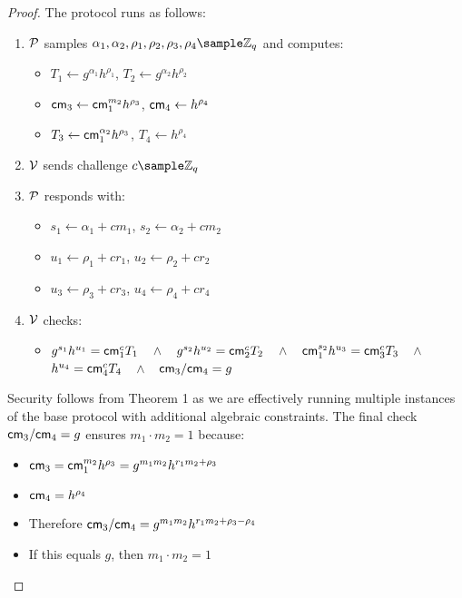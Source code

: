 \begin{proof}
    The protocol runs as follows:
    \begin{enumerate}
        \item $\mathcal{P}$ samples $\alpha_1, \alpha_2, \rho_1, \rho_2, \rho_3, \rho_4 \sample \Z_q$ and computes:
            \begin{itemize}
                \item $T_1 \gets g^{\alpha_1}h^{\rho_1}$, $T_2 \gets g^{\alpha_2}h^{\rho_2}$
                \item $\mathsf{cm}_3 \gets \mathsf{cm}_1^{m_2}h^{\rho_3}$, $\mathsf{cm}_4 \gets h^{\rho_4}$
                \item $T_3 \gets \mathsf{cm}_1^{\alpha_2}h^{\rho_3}$, $T_4 \gets h^{\rho_4}$
            \end{itemize}
        
        \item $\mathcal{V}$ sends challenge $c \sample \Z_q$
        
        \item $\mathcal{P}$ responds with:
            \begin{itemize}
                \item $s_1 \gets \alpha_1 + cm_1$, $s_2 \gets \alpha_2 + cm_2$
                \item $u_1 \gets \rho_1 + cr_1$, $u_2 \gets \rho_2 + cr_2$
                \item $u_3 \gets \rho_3 + cr_3$, $u_4 \gets \rho_4 + cr_4$
            \end{itemize}
            
        \item $\mathcal{V}$ checks:
         \begin{itemize}
            \item $g^{s_1}h^{u_1} = \mathsf{cm}_1^cT_1$ $\;\; \wedge \;\;$ $g^{s_2}h^{u_2} = \mathsf{cm}_2^cT_2$ $\; \; \wedge \;\;$ $\mathsf{cm}_1^{s_2}h^{u_3} = \mathsf{cm}_3^cT_3$ $\;\; \wedge \;\;$ $h^{u_4} = \mathsf{cm}_4^cT_4$ $\;\; \wedge \;\;$ $\mathsf{cm}_3 / \mathsf{cm}_4 = g$
         \end{itemize}
    \end{enumerate}

    \noindent Security follows from Theorem 1 as we are effectively running multiple instances of the base protocol with additional algebraic constraints. The final check $\mathsf{cm}_3/\mathsf{cm}_4 = g$ ensures $m_1 \cdot m_2 = 1$ because:
    \begin{itemize}
        \item $\mathsf{cm}_3 = \mathsf{cm}_1^{m_2}h^{\rho_3} = g^{m_1m_2}h^{r_1m_2 + \rho_3}$
        \item $\mathsf{cm}_4 = h^{\rho_4}$
        \item Therefore $\mathsf{cm}_3/\mathsf{cm}_4 = g^{m_1m_2}h^{r_1m_2 + \rho_3 - \rho_4}$
        \item If this equals $g$, then $m_1 \cdot m_2 = 1$
    \end{itemize}
\end{proof}


